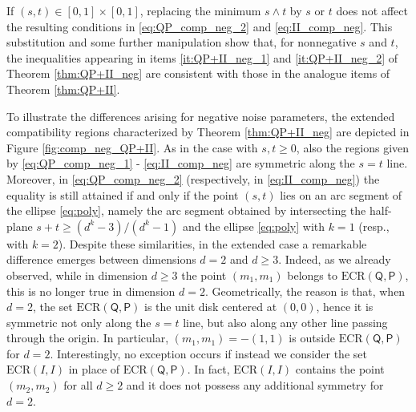 \documentclass[12pt,reqno]{amsart}
\theoremstyle{definition}
\newcommand{\Qo}{\mathsf{Q}}%
\newcommand{\Po}{\mathsf{P}}%
\newcommand{\ECR}[1]{\textrm{ECR} #1} %
\begin{document}
If $(s,t)\in [0,1]\times[0,1]$, replacing the minimum $s\wedge t$ by $s$ or $t$ does not affect the resulting conditions in \eqref{eq:QP_comp_neg_2} and \eqref{eq:II_comp_neg}. This substitution and some further manipulation show that, for nonnegative $s$ and $t$, the inequalities appearing in items \eqref{it:QP+II_neg_1} and \eqref{it:QP+II_neg_2} of Theorem \ref{thm:QP+II_neg} are consistent with those in the analogue items of Theorem \ref{thm:QP+II}.

To illustrate the differences arising for negative noise parameters, the extended compatibility regions characterized by Theorem \ref{thm:QP+II_neg} are depicted in Figure \ref{fig:comp_neg_QP+II}. As in the case with $s,t\geq 0$, also the regions given by \eqref{eq:QP_comp_neg_1} - \eqref{eq:II_comp_neg} are symmetric along the $s=t$ line. Moreover, in \eqref{eq:QP_comp_neg_2} (respectively, in \eqref{eq:II_comp_neg}) the equality is still attained if and only if the point $(s,t)$ lies on an arc segment of the ellipse \eqref{eq:poly}, namely the arc segment obtained by intersecting the half-plane $s+t\geq (d^k-3)/(d^k-1)$ and the ellipse \eqref{eq:poly} with $k=1$ (resp., with $k=2$). Despite these similarities, in the extended case a remarkable difference emerges between dimensions $d=2$ and $d\geq 3$.
Indeed, as we already observed, while in dimension $d\geq 3$ the point $(m_1,m_1)$ belongs to $\ECR{(\Qo,\Po)}$, this is no longer true in dimension $d=2$. Geometrically, the reason is that, when $d=2$, the set $\ECR{(\Qo,\Po)}$ is the unit disk centered at $(0,0)$, hence it is symmetric not only along the $s=t$ line, but also along any other line passing through the origin. 
In particular, $(m_1,m_1) = -(1,1)$ is outside $\ECR{(\Qo,\Po)}$ for $d=2$. Interestingly, no exception occurs if instead we consider the set $\ECR{(I,I)}$ in place of $\ECR{(\Qo,\Po)}$. In fact, $\ECR{(I,I)}$ contains the point $(m_2,m_2)$ for all $d\geq 2$ and it does not possess any additional symmetry for $d=2$.
\end{document}
